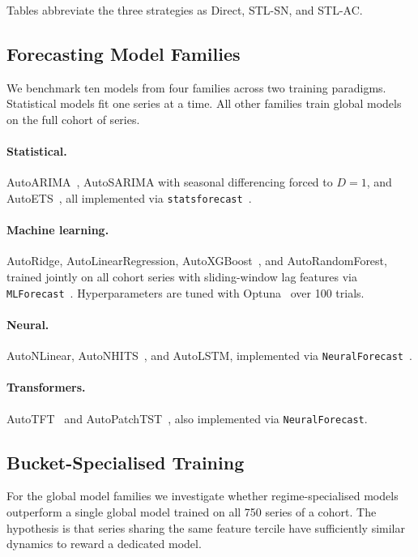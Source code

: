 \documentclass[pdflatex,sn-mathphys-num]{sn-jnl}
\theoremstyle{thmstyleone}
\theoremstyle{thmstyletwo}
\theoremstyle{thmstylethree}
\begin{document}
Tables abbreviate the three strategies as Direct, STL-SN, and STL-AC.

\subsection{Forecasting Model Families}\label{sec:models}

We benchmark ten models from four families across two training paradigms.
Statistical models fit one series at a time. All other families train global
models on the full cohort of series.

\paragraph{Statistical.}
AutoARIMA~\cite{hyndman2008automatic}, AutoSARIMA with seasonal differencing
forced to $D = 1$, and AutoETS~\cite{hyndman2008exponential}, all implemented
via \texttt{statsforecast}~\cite{olivares2022statsforecast}.

\paragraph{Machine learning.}
AutoRidge, AutoLinearRegression, AutoXGBoost~\cite{chen2016xgboost}, and
AutoRandomForest, trained jointly on all cohort series with sliding-window lag
features via \texttt{MLForecast}~\cite{garza2022mlforecast}. Hyperparameters
are tuned with Optuna~\cite{akiba2019optuna} over 100 trials.

\paragraph{Neural.}
AutoNLinear, AutoNHITS~\cite{challu2023nhits}, and AutoLSTM, implemented via
\texttt{NeuralForecast}~\cite{olivares2023neuralforecast}.

\paragraph{Transformers.}
AutoTFT~\cite{lim2021tft} and AutoPatchTST~\cite{nie2022patchtst}, also
implemented via \texttt{NeuralForecast}.

\subsection{Bucket-Specialised Training}\label{sec:finetuning}

For the global model families we investigate whether regime-specialised models
outperform a single global model trained on all 750 series of a cohort. The
hypothesis is that series sharing the same feature tercile have sufficiently
similar dynamics to reward a dedicated model.
\end{document}
